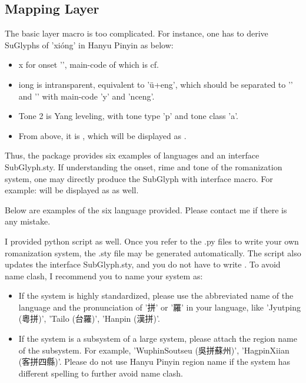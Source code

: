 \subsection{Mapping Layer}
The basic layer macro is too complicated. For instance, one has to derive SuGlyphs of 'xióng' in Hanyu Pinyin as below: 
\begin{itemize}
	\item x for onset '', main-code of which is cf. 
	\item iong is intransparent, equivalent to 'ü+eng', which should be separated to ''  and '' with main-code 'y' and 'nceng'. 
	\item Tone 2 is Yang leveling, with tone type 'p' and tone class 'a'. 
	\item From above, it is , which will be displayed as . 
\end{itemize}
Thus, the package provides six examples of languages and an interface SubGlyph.sty. If understanding the onset, rime and tone of the romanization system, one may directly produce the SubGlyph with interface macro. For example:  will be displayed as  as well. \par
Below are examples of the six language provided. Please contact me if there is any mistake. \par
%
I provided python script as well. Once you refer to the .py files to write your own romanization system, the .sty file may be generated automatically. The script also updates the interface SubGlyph.sty, and you do not have to write \detokenize{\usepackage{SGYoursystem.sty}}. To avoid name clash, I recommend you to name your system as: \par
\begin{itemize}
	\item If the system is highly standardized, please use the abbreviated name of the language and the pronunciation of '拼' or '羅' in your language, like 'Jyutping (粵拼)', 'Tailo (台羅)', 'Hanpin (漢拼)'. 
	\item If the system is a subsystem of a large system, please attach the region name of the subsystem. For example, 'WuphinSoutseu (吳拼蘇州)', 'HagpinXiian (客拼四縣)'. Please do not use Hanyu Pinyin region name if the system has different spelling to further avoid name clash. 
\end{itemize}

